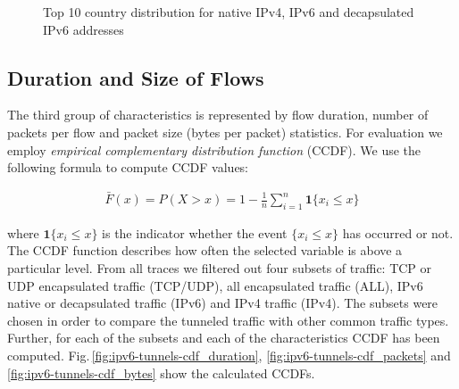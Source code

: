 \begin{figure}[!tb]
     \hspace{2mm}
    \caption{Top 10 country distribution for native IPv4, IPv6 and decapsulated IPv6 addresses}
    \label{fig:ipv6-tunnels-top-ten-geo}
\end{figure}

\subsection{Duration and Size of Flows}
The third group of characteristics is represented by flow duration, number of packets per flow and packet size (bytes per packet) statistics. For evaluation we employ \textit{empirical complementary distribution function} (CCDF). We use the following formula to compute CCDF values:

\begin{align}
    \bar{F}(x)= P(X>x)=1-\frac{1}{n}\sum^{n}_{i=1}\mathbf{1}\{x_{i}\leq x\}
\end{align}

where $\mathbf{1}\{x_{i}\leq x\}$ is the indicator whether the event $\{x_{i}\leq x\}$ has occurred or not. The CCDF function describes how often the selected variable is above a particular level. From all traces we filtered out four subsets of traffic: TCP or UDP encapsulated traffic (TCP/UDP), all encapsulated traffic (ALL), IPv6 native or decapsulated traffic (IPv6) and IPv4 traffic (IPv4). The subsets were chosen in order to compare the tunneled traffic with other common traffic types. Further, for each of the subsets and each of the characteristics CCDF has been computed. Fig.\,\ref{fig:ipv6-tunnels-cdf_duration}, \ref{fig:ipv6-tunnels-cdf_packets} and \ref{fig:ipv6-tunnels-cdf_bytes} show the calculated CCDFs.

